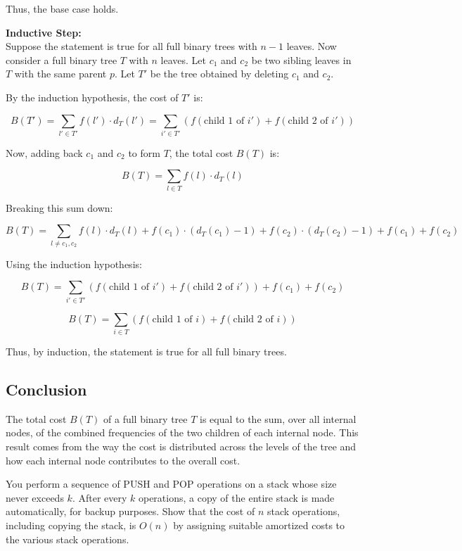 \documentclass[10pt,letter,notitlepage]{article}
\newcounter{exercise}
\begin{document}
\begin{Answer}
Thus, the base case holds.

\textbf{Inductive Step:} \\
Suppose the statement is true for all full binary trees with $n - 1$ leaves. Now consider a full binary tree $T$ with $n$ leaves. Let $c_1$ and $c_2$ be two sibling leaves in $T$ with the same parent $p$. Let $T'$ be the tree obtained by deleting $c_1$ and $c_2$.

By the induction hypothesis, the cost of $T'$ is:

\[
B(T') = \sum_{l' \in T'} f(l') \cdot d_T(l') = \sum_{i' \in T'} (f(\text{child 1 of } i') + f(\text{child 2 of } i'))
\]

Now, adding back $c_1$ and $c_2$ to form $T$, the total cost $B(T)$ is:

\[
B(T) = \sum_{l \in T} f(l) \cdot d_T(l)
\]

Breaking this sum down:

\[
B(T) = \sum_{l \neq c_1, c_2} f(l) \cdot d_T(l) + f(c_1) \cdot (d_T(c_1) - 1) + f(c_2) \cdot (d_T(c_2) - 1) + f(c_1) + f(c_2)
\]

Using the induction hypothesis:

\[
B(T) = \sum_{i' \in T'} (f(\text{child 1 of } i') + f(\text{child 2 of } i')) + f(c_1) + f(c_2)
\]

\[
B(T) = \sum_{i \in T} (f(\text{child 1 of } i) + f(\text{child 2 of } i))
\]

Thus, by induction, the statement is true for all full binary trees.

\subsection*{Conclusion}
The total cost $B(T)$ of a full binary tree $T$ is equal to the sum, over all internal nodes, of the combined frequencies of the two children of each internal node. This result comes from the way the cost is distributed across the levels of the tree and how each internal node contributes to the overall cost.


\end{Answer}


\begin{exercise}[(10 marks)]
You perform a sequence of PUSH and POP operations on a stack whose size never exceeds $k$. After every $k$ operations, a copy of the entire stack is made automatically, for backup purposes. Show that the cost of $n$ stack operations, including copying the stack, is $O(n)$ by assigning suitable amortized costs to the various stack operations.
\end{exercise}
\end{document}
